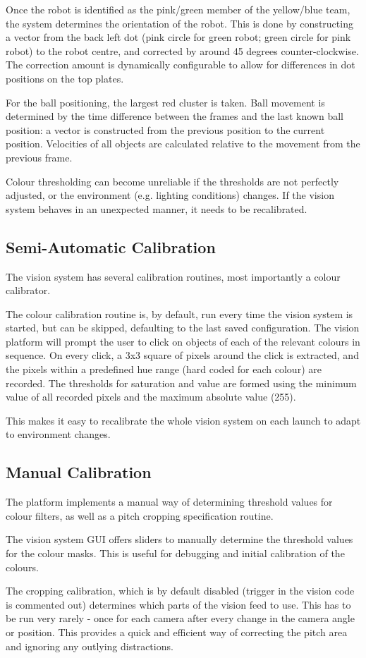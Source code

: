 Once the robot is identified as the pink/green member of the yellow/blue team, the system determines the orientation of the robot. This is done by constructing a vector from the back left dot (pink circle for green robot; green circle for pink robot) to the robot centre, and corrected by around 45 degrees counter-clockwise. The correction amount is dynamically configurable to allow for differences in dot positions on the top plates.

For the ball positioning, the largest red cluster is taken. Ball movement is determined by the time difference between the frames and the last known ball position: a vector is constructed from the previous position to the current position. Velocities of all objects are calculated relative to the movement from the previous frame. 

Colour thresholding can become unreliable if the thresholds are not perfectly adjusted, or the environment (e.g. lighting conditions) changes. If the vision system behaves in an unexpected manner, it needs to be recalibrated.


\subsection{Semi-Automatic Calibration}

The vision system has several calibration routines, most importantly a colour calibrator. 

The colour calibration routine is, by default, run every time the vision system is started, but can be skipped, defaulting to the last saved configuration. The vision platform will prompt the user to click on objects of each of the relevant colours in sequence. On every click, a 3x3 square of pixels around the click is extracted, and the pixels within a predefined hue range (hard coded for each colour) are recorded. The thresholds for saturation and value are formed using the minimum value of all recorded pixels and the maximum absolute value (255).

This makes it easy to recalibrate the whole vision system on each launch to adapt to environment changes.


\subsection{Manual Calibration}
The platform implements a manual way of determining threshold values for colour filters, as well as a pitch cropping specification routine.

The vision system GUI offers sliders to manually determine the threshold values for the colour masks. This is useful for debugging and initial calibration of the colours.

The cropping calibration, which is by default disabled (trigger in the vision code is commented out) determines which parts of the vision feed to use. This has to be run very rarely - once for each camera after every change in the camera angle or position. This provides a quick and efficient way of correcting the pitch area and ignoring any outlying distractions.

